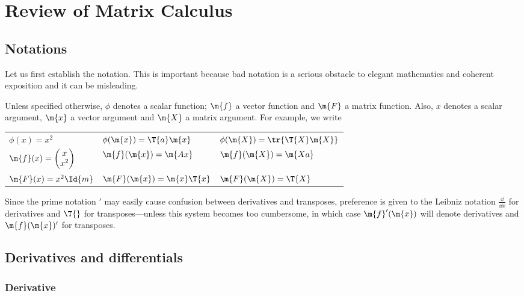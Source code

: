\chapter{Review of Matrix Calculus}

\setlength{\parindent}{0in}

\section{Notations}

Let us first establish the notation. This is important because bad notation is a serious obstacle to elegant mathematics and coherent exposition and it can be misleading.

Unless specified otherwise, $\phi$ denotes a scalar function; $\m{f}$ a vector function and $\m{F}$ a matrix function. Also, $x$ denotes a scalar argument, $\m{x}$ a vector argument and $\m{X}$ a matrix argument. For example, we write

\begin{table*}[h]
  \begin{center}
  \begin{tabular}{lll}
    $\phi(x)=x^2$     &$\phi(\m{x})=\T{a}\m{x}$       &$\phi(\m{X})=\tr{\T{X}\m{X}}$\\
    $\m{f}(x)=
      \begin{pmatrix}
        x\\
        x^2
      \end{pmatrix}$    &$\m{f}(\m{x})=\m{Ax}$    &$\m{f}(\m{X})=\m{Xa}$\\
      $\m{F}(x)=x^2\Id{m}$  &$\m{F}(\m{x})=\m{x}\T{x}$  &$\m{F}(\m{X})=\T{X}$
  \end{tabular}
\end{center}
\end{table*}

Since the prime notation $'$ may easily cause confusion between derivatives and transposes, preference is given to the Leibniz notation $\frac{\dd}{\dd x}$ for derivatives and $\T{}$ for transposes---unless this system becomes too cumbersome, in which case $\m{f}'(\m{x})$ will denote derivatives and $\m{f}(\m{x})'$ for transposes.

\section{Derivatives and differentials}

\subsection{Derivative}

